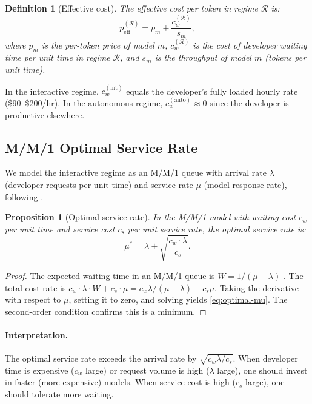 \documentclass[11pt, a4paper, logo, copyright]{googledeepmind}
\newtheorem{definition}{Definition}[section]
\newtheorem{proposition}{Proposition}[section]
\begin{document}
\begin{definition}[Effective cost]\label{def:effective-cost}
The \emph{effective cost per token} in regime $\mathcal{R}$ is:
\begin{equation}\label{eq:effective-cost}
    p_{\text{eff}}^{(\mathcal{R})} = p_m + \frac{c_w^{(\mathcal{R})}}{s_m},
\end{equation}
where $p_m$ is the per-token price of model $m$, $c_w^{(\mathcal{R})}$ is the cost of developer waiting time per unit time in regime $\mathcal{R}$, and $s_m$ is the throughput of model $m$ (tokens per unit time).
\end{definition}

In the interactive regime, $c_w^{(\text{int})}$ equals the developer's fully loaded hourly rate (\$90--\$200/hr). In the autonomous regime, $c_w^{(\text{auto})} \approx 0$ since the developer is productive elsewhere.

\subsection{M/M/1 Optimal Service Rate}

We model the interactive regime as an M/M/1 queue with arrival rate $\lambda$ (developer requests per unit time) and service rate $\mu$ (model response rate), following \citet{kleinrock1975}.

\begin{proposition}[Optimal service rate]\label{prop:optimal-mu}
In the M/M/1 model with waiting cost $c_w$ per unit time and service cost $c_s$ per unit service rate, the optimal service rate is:
\begin{equation}\label{eq:optimal-mu}
    \mu^* = \lambda + \sqrt{\frac{c_w \cdot \lambda}{c_s}}.
\end{equation}
\end{proposition}

\begin{proof}
The expected waiting time in an M/M/1 queue is $W = 1/(\mu - \lambda)$ \citep{kleinrock1975}. The total cost rate is $c_w \cdot \lambda \cdot W + c_s \cdot \mu = c_w \lambda / (\mu - \lambda) + c_s \mu$. Taking the derivative with respect to $\mu$, setting it to zero, and solving yields \cref{eq:optimal-mu}. The second-order condition confirms this is a minimum.
\end{proof}

\paragraph{Interpretation.}
The optimal service rate exceeds the arrival rate by $\sqrt{c_w \lambda / c_s}$. When developer time is expensive ($c_w$ large) or request volume is high ($\lambda$ large), one should invest in faster (more expensive) models. When service cost is high ($c_s$ large), one should tolerate more waiting.
\end{document}
